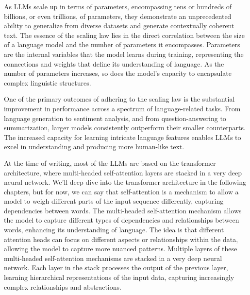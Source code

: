 As LLMs scale up in terms of parameters, encompassing tens or hundreds of billions, or even trillions, of parameters, they demonstrate an unprecedented ability to generalize from diverse datasets and generate contextually coherent text.
The essence of the scaling law lies in the direct correlation between the size of a language model and the number of parameters it encompasses.
Parameters are the internal variables that the model learns during training, representing the connections and weights that define its understanding of language.
As the number of parameters increases, so does the model's capacity to encapsulate complex linguistic structures.

One of the primary outcomes of adhering to the scaling law is the substantial improvement in performance across a spectrum of language-related tasks.
From language generation to sentiment analysis, and from question-answering to summarization, larger models consistently outperform their smaller counterparts.
The increased capacity for learning intricate language features enables LLMs to excel in understanding and producing more human-like text.

At the time of writing, most of the LLMs are based on the transformer architecture, where multi-headed self-attention layers are stacked in a very deep neural network.
We'll deep dive into the transformer architecture in the following chapters, but for now, we can say that self-attention is a mechanism to allow a model to weigh different parts of the input sequence differently, capturing dependencies between words.
The multi-headed self-attention mechanism allows the model to capture different types of dependencies and relationships between words, enhancing its understanding of language.
The idea is that different attention heads can focus on different aspects or relationships within the data, allowing the model to capture more nuanced patterns.
Multiple layers of these multi-headed self-attention mechanisms are stacked in a very deep neural network.
Each layer in the stack processes the output of the previous layer, learning hierarchical representations of the input data, capturing increasingly complex relationships and abstractions.

